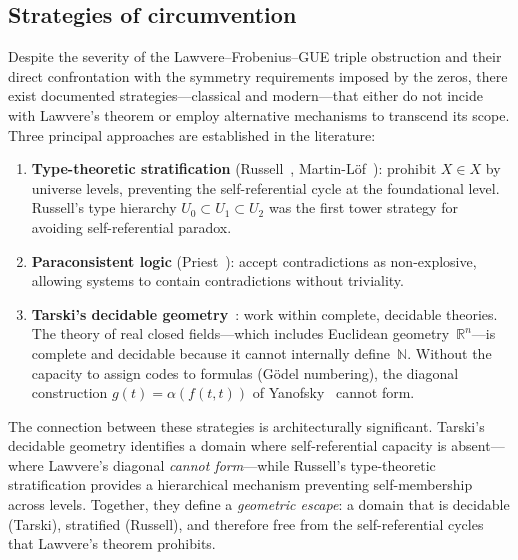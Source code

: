 \subsection{Strategies of circumvention}\label{ssec:circumvention}

Despite the severity of the Lawvere--Frobenius--GUE triple obstruction
and their direct confrontation with the symmetry requirements imposed
by the zeros, there exist documented strategies---classical and
modern---that either do not incide with Lawvere's theorem or employ
alternative mechanisms to transcend its scope.  Three principal
approaches are established in the literature:

\begin{enumerate}
  \item \textbf{Type-theoretic stratification}
    (Russell~\cite{russell08}, Martin-L\"of~\cite{martinlof75}):
    prohibit $X \in X$ by universe levels, preventing the self-referential
    cycle at the foundational level.  Russell's type hierarchy
    $U_0 \subset U_1 \subset U_2$ was the first tower strategy for
    avoiding self-referential paradox.

  \item \textbf{Paraconsistent logic} (Priest~\cite{priest79}):
    accept contradictions as non-explosive, allowing systems to contain
    contradictions without triviality.

  \item \textbf{Tarski's decidable geometry}~\cite{tarski52,tarskigivant99}:
    work within complete, decidable theories.  The theory of real
    closed fields---which includes Euclidean geometry~$\mathbb{R}^n$---is
    complete and decidable because it cannot internally
    define~$\mathbb{N}$.  Without the capacity to assign codes to
    formulas (G\"odel numbering), the diagonal construction
    $g(t)=\alpha(f(t,t))$ of Yanofsky~\cite{yanofsky03} cannot form.
\end{enumerate}

The connection between these strategies is architecturally
significant.  Tarski's decidable geometry identifies a domain where
self-referential capacity is absent---where Lawvere's diagonal
\emph{cannot form}---while Russell's type-theoretic stratification
provides a hierarchical mechanism preventing self-membership across
levels.  Together, they define a \emph{geometric escape}: a domain
that is decidable (Tarski), stratified (Russell), and therefore free
from the self-referential cycles that Lawvere's theorem prohibits.

